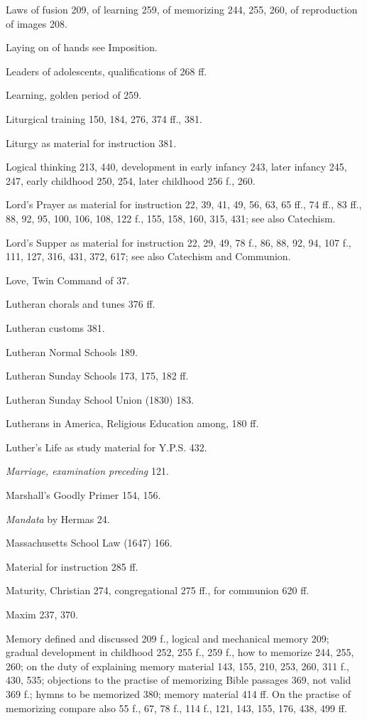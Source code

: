 Laws of fusion 209, of learning 259, of memorizing 244, 255, 260, of reproduction of images 208.

Laying on of hands see Imposition.

Leaders of adolescents, qualifications of 268 ff.

Learning, golden period of 259.

Liturgical training 150, 184, 276, 374 ff., 381.

Liturgy as material for instruction 381.

Logical thinking 213, 440, development in early infancy 243, later infancy 245, 247, early childhood 250, 254, later childhood 256 f., 260.

Lord’s Prayer as material for instruction 22, 39, 41, 49, 56, 63, 65 ff., 74 ff., 83 ff., 88, 92, 95, 100, 106, 108, 122 f., 155, 158, 160, 315, 431; see also Catechism.

Lord’s Supper as material for instruction 22, 29, 49, 78 f., 86, 88, 92, 94, 107 f., 111, 127, 316, 431, 372, 617; see also Catechism and Communion.

Love, Twin Command of 37.

Lutheran chorals and tunes 376 ff.

Lutheran customs 381.

Lutheran Normal Schools 189.

Lutheran Sunday Schools 173, 175, 182 ff.

Lutheran Sunday School Union (1830) 183.

Lutherans in America, Religious Education among, 180 ff.

Luther’s Life as study material for Y.P.S. 432.

\emph{Marriage, examination preceding} 121.

Marshall’s Goodly Primer 154, 156.

\emph{Mandata} by Hermas 24.

Massachusetts School Law (1647) 166.

Material for instruction 285 ff.

Maturity, Christian 274, congregational 275 ff., for communion 620 ff.

Maxim 237, 370.

Memory defined and discussed 209 f., logical and mechanical memory 209; gradual development in childhood 252, 255 f., 259 f., how to memorize 244, 255, 260; on the duty of explaining memory material 143, 155, 210, 253, 260, 311 f., 430, 535; objections to the practise of memorizing Bible passages 369, not valid 369 f.; hymns to be memorized 380; memory material 414 ff. On the practise of memorizing compare also 55 f., 67, 78 f., 114 f., 121, 143, 155, 176, 438, 499 ff.

